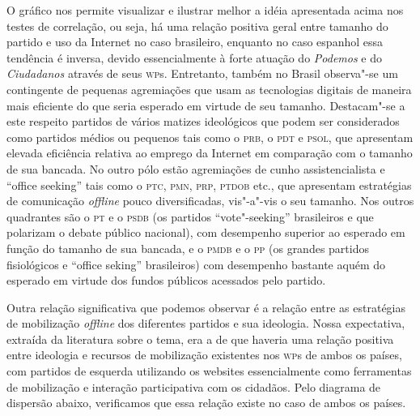 O gráfico nos permite visualizar e ilustrar melhor a idéia apresentada
acima nos testes de correlação, ou seja, há uma relação positiva geral
entre tamanho do partido e uso da Internet no caso brasileiro, enquanto
no caso espanhol essa tendência é inversa, devido essencialmente à forte
atuação do \emph{Podemos} e do \emph{Ciudadanos} através de seus \textsc{wp}s.
Entretanto, também no Brasil observa"-se um contingente de pequenas
agremiações que usam as tecnologias digitais de maneira mais eficiente
do que seria esperado em virtude de seu tamanho. Destacam"-se a este
respeito partidos de vários matizes ideológicos que podem ser
considerados como partidos médios ou pequenos tais como o \textsc{prb}, o \textsc{pdt} e
\textsc{psol}, que apresentam elevada eficiência relativa ao emprego da Internet
em comparação com o tamanho de sua bancada. No outro pólo estão
agremiações de cunho assistencialista e ``office seeking'' tais como o
\textsc{ptc}, \textsc{pmn}, \textsc{prp}, \textsc{ptdob} etc., que apresentam estratégias de comunicação
\emph{offline} pouco diversificadas, vis"-a"-vis o seu tamanho. Nos outros
quadrantes são o \textsc{pt} e o \textsc{psdb} (os partidos ``vote"-seeking'' brasileiros e
que polarizam o debate público nacional), com desempenho superior ao
esperado em função do tamanho de sua bancada, e o \textsc{pmdb} e o \textsc{pp} (os
grandes partidos fisiológicos e ``office seking'' brasileiros) com
desempenho bastante aquém do esperado em virtude dos fundos públicos
acessados pelo partido.

Outra relação significativa que podemos observar é a relação entre as
estratégias de mobilização \emph{offline} dos diferentes partidos e sua
ideologia. Nossa expectativa, extraída da literatura sobre o tema, era a
de que haveria uma relação positiva entre ideologia e recursos de
mobilização existentes nos \textsc{wp}s de ambos os países, com partidos de
esquerda utilizando os websites essencialmente como ferramentas de
mobilização e interação participativa com os cidadãos. Pelo diagrama de
dispersão abaixo, verificamos que essa relação existe no caso de ambos
os países.

\pagebreak

